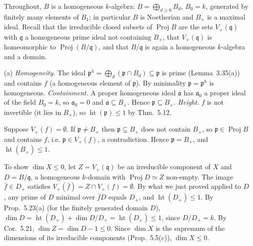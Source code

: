 \documentclass[11pt]{article}
\begin{document}
\pf
Throughout, $B$ is a homogeneous $k$-algebra: $B=\bigoplus_{d\ge0}B_d$, $B_0=k$, generated by finitely many elements of $B_1$; in particular $B$ is Noetherian and $B_+$ is a maximal ideal. Recall that the irreducible closed subsets of $\operatorname{Proj}B$ are the sets $V_+(\mathfrak q)$ with $\mathfrak q$ a homogeneous prime ideal not containing $B_+$, that $V_+(\mathfrak q)$ is homeomorphic to $\operatorname{Proj}(B/\mathfrak q)$, and that $B/\mathfrak q$ is again a homogeneous $k$-algebra and a domain.

(a) \emph{Homogeneity.} The ideal $\mathfrak p^h=\bigoplus_d(\mathfrak p\cap B_d)\subseteq\mathfrak p$ is prime (Lemma~3.35(a)) and contains $f$ (a homogeneous element of $\mathfrak p$). By minimality $\mathfrak p=\mathfrak p^h$ is homogeneous. \emph{Containment.} A proper homogeneous ideal $\mathfrak a$ has $\mathfrak a_0$ a proper ideal of the field $B_0=k$, so $\mathfrak a_0=0$ and $\mathfrak a\subseteq B_+$. Hence $\mathfrak p\subseteq B_+$. \emph{Height.} $f$ is not invertible (it lies in $B_+$), so $\operatorname{ht}(\mathfrak p)\le1$ by Thm.~5.12.

Suppose $V_+(f)=\emptyset$. If $\mathfrak p\ne B_+$ then $\mathfrak p\subsetneq B_+$ does not contain $B_+$, so $\mathfrak p\in\operatorname{Proj}B$ and contains $f$, i.e. $\mathfrak p\in V_+(f)$, a contradiction. Hence $\mathfrak p=B_+$, and $\operatorname{ht}(B_+)\le1$.

To show $\dim X\le0$, let $Z=V_+(\mathfrak q)$ be an irreducible component of $X$ and $D=B/\mathfrak q$, a homogeneous $k$-domain with $\operatorname{Proj}D\simeq Z$ non-empty. The image $\bar f\in D_+$ satisfies $V_+(\bar f)=Z\cap V_+(f)=\emptyset$. By what we just proved applied to $D$, any prime of $D$ minimal over $\bar fD$ equals $D_+$, and $\operatorname{ht}(D_+)\le1$. By Prop.~5.23(a) (for the finitely generated domain $D$), $\dim D=\operatorname{ht}(D_+)+\dim D/D_+=\operatorname{ht}(D_+)\le1$, since $D/D_+=k$. By Cor.~5.21, $\dim Z=\dim D-1\le0$. Since $\dim X$ is the supremum of the dimensions of its irreducible components (Prop.~5.5(c)), $\dim X\le0$.
\end{document}
